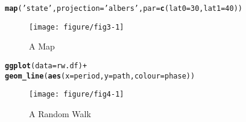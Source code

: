 \documentclass{article}\usepackage[]{graphicx}\usepackage[]{color}
\makeatletter
\def\maxwidth{ %
  \ifdim\Gin@nat@width>\linewidth
    \linewidth
  \else
    \Gin@nat@width
  \fi
}
\newcommand{\hlnum}[1]{\textcolor[rgb]{0.686,0.059,0.569}{#1}}%
\newcommand{\hlstr}[1]{\textcolor[rgb]{0.192,0.494,0.8}{#1}}%
\newcommand{\hlopt}[1]{\textcolor[rgb]{0,0,0}{#1}}%
\newcommand{\hlstd}[1]{\textcolor[rgb]{0.345,0.345,0.345}{#1}}%
\newcommand{\hlkwc}[1]{\textcolor[rgb]{0.333,0.667,0.333}{#1}}%
\newcommand{\hlkwd}[1]{\textcolor[rgb]{0.737,0.353,0.396}{\textbf{#1}}}%
\newenvironment{kframe}{%
 \def\at@end@of@kframe{}%
 \ifinner\ifhmode%
  \def\at@end@of@kframe{\end{minipage}}%
  \begin{minipage}{\columnwidth}%
 \fi\fi%
 \def\FrameCommand##1{\hskip\@totalleftmargin \hskip-\fboxsep
 \colorbox{shadecolor}{##1}\hskip-\fboxsep
     \hskip-\linewidth \hskip-\@totalleftmargin \hskip\columnwidth}%
 \MakeFramed {\advance\hsize-\width
   \@totalleftmargin\z@ \linewidth\hsize
   \@setminipage}}%
 {\par\unskip\endMakeFramed%
 \at@end@of@kframe}
\newenvironment{knitrout}{}{} %
\makeatother
\begin{document}
\clearpage
\begin{knitrout}
\color{fgcolor}\begin{kframe}
\begin{alltt}
\hlkwd{map}\hlstd{(}\hlstr{'state'}\hlstd{,} \hlkwc{projection} \hlstd{=} \hlstr{'albers'}\hlstd{,} \hlkwc{par} \hlstd{=} \hlkwd{c}\hlstd{(}\hlkwc{lat0} \hlstd{=} \hlnum{30}\hlstd{,} \hlkwc{lat1} \hlstd{=} \hlnum{40}\hlstd{))}
\end{alltt}
\end{kframe}\begin{figure}[ht]

{\centering \texttt{[image: figure/fig3-1]} 

}

\caption[A Map]{A Map}\label{fig:fig3}
\end{figure}


\end{knitrout}

\clearpage
\begin{knitrout}
\color{fgcolor}\begin{kframe}
\begin{alltt}
\hlkwd{ggplot}\hlstd{(}\hlkwc{data} \hlstd{= rw.df)} \hlopt{+}
  \hlkwd{geom_line}\hlstd{(}\hlkwd{aes}\hlstd{(}\hlkwc{x} \hlstd{= period,} \hlkwc{y} \hlstd{= path,} \hlkwc{colour} \hlstd{= phase))}
\end{alltt}
\end{kframe}\begin{figure}[ht]

{\centering \texttt{[image: figure/fig4-1]} 

}

\caption[A Random Walk]{A Random Walk}\label{fig:fig4}
\end{figure}


\end{knitrout}
\end{document}
